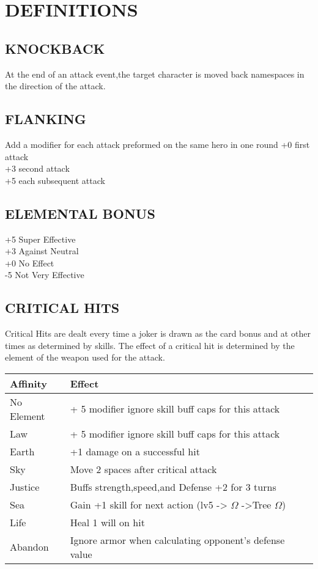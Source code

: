 \chapter{DEFINITIONS}
\section{KNOCKBACK}
At the end of an attack event,the target character is moved back namespaces in the direction of the attack.
\section{FLANKING}
Add a modifier for each attack preformed on the same hero in one round
+0 first attack\\
+3 second attack\\
+5 each subsequent attack\\
\section{ELEMENTAL BONUS}
+5 Super Effective\\
+3 Against Neutral\\
+0 No Effect\\
-5 Not Very Effective
\section{CRITICAL HITS}
Critical Hits are dealt every time a joker is drawn as the card bonus and at other times as determined by skills.  The effect of a critical hit is determined by the element of the weapon used for the attack.\\
\begin{center}
\begin{tabularx}{\textwidth}{X X}
\hline
Affinity & Effect \\
\hline
No Element & + 5 modifier ignore skill buff caps for this attack \\
Law        & + 5 modifier ignore skill buff caps for this attack \\
Earth      & +1 damage on a successful hit \\
Sky        & Move 2 spaces after critical attack\\
Justice    & Buffs strength,speed,and Defense +2 for 3 turns\\
Sea        & Gain +1 skill for next action (lv5 -> $\Omega$ ->Tree $\Omega$) \\
Life & Heal 1 will on hit \\
Abandon & Ignore armor when calculating opponent's defense value\\
\hline
\end{tabularx}
\end{center}


